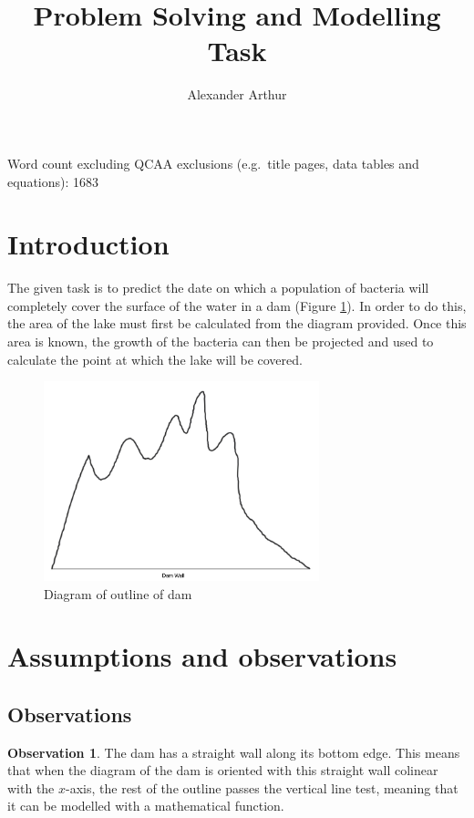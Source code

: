 \documentclass[a4paper]{article}
\title{Problem Solving and Modelling Task}
\author{Alexander Arthur}
\theoremstyle{definition}
\newtheorem{observation}{Observation}
\begin{document}
\maketitle
\setcounter{tocdepth}{1}
\tableofcontents

\vfill

Word count excluding QCAA exclusions (e.g.\ title pages, data tables and equations): 1683

\newpage

\section{Introduction}
    The given task is to predict the date on which a population of bacteria will completely cover the surface of the water in a dam (Figure \ref{figDamOutline}). In order to do this, the area of the lake must first be calculated from the diagram provided. Once this area is known, the growth of the bacteria can then be projected and used to calculate the point at which the lake will be covered.

    \begin{figure} %
        \centering
        \includegraphics[width = 8cm]{damDiagram.png}
        \caption{Diagram of outline of dam}
        \label{figDamOutline}
    \end{figure}



\section{Assumptions and observations}

    \subsection{Observations}

        \begin{observation}
            The dam has a straight wall along its bottom edge. This means that when the diagram of the dam is oriented with this straight wall colinear with the $x$-axis, the rest of the outline passes the vertical line test, meaning that it can be modelled with a mathematical function.
        \end{observation}
\end{document}
